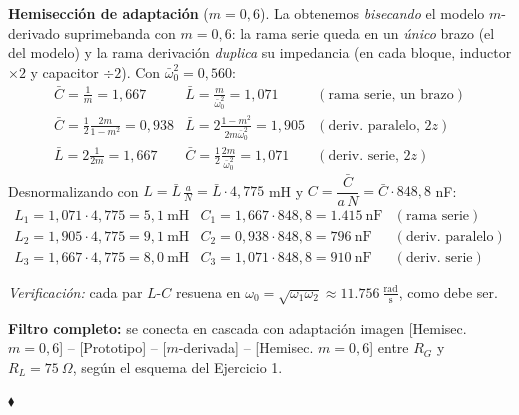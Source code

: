 \documentclass[class=article, crop=false, oneside]{standalone}
\begin{document}
\begin{figure}[H]
    \centering
    
\end{figure}

\noindent\textbf{Hemisección de adaptación} ($m = 0{,}6$). La obtenemos
\emph{bisecando} el modelo $m$-derivado suprimebanda con $m=0{,}6$: la rama serie
queda en un \emph{único} brazo (el del modelo) y la rama derivación \emph{duplica} su
impedancia (en cada bloque, inductor $\times2$ y capacitor $\div2$). Con
$\bar\omega_0^2 = 0{,}560$:
\[
    \begin{array}{lll}
        \bar C=\tfrac{1}{m}=1{,}667 & \bar L=\tfrac{m}{\bar\omega_0^2}=1{,}071 & (\text{rama serie, un brazo})\\[3pt]
        \bar C=\tfrac{1}{2}\tfrac{2m}{1-m^2}=0{,}938 & \bar L=2\tfrac{1-m^2}{2m\bar\omega_0^2}=1{,}905 & (\text{deriv.\ paralelo, }2z)\\[3pt]
        \bar L=2\tfrac{1}{2m}=1{,}667 & \bar C=\tfrac{1}{2}\tfrac{2m}{\bar\omega_0^2}=1{,}071 & (\text{deriv.\ serie, }2z)
    \end{array}
\]
Desnormalizando con $L=\bar L\,\tfrac{a}{N}=\bar L\cdot 4{,}775$ mH y $C=\dfrac{\bar C}{a\,N}=\bar C\cdot 848{,}8$ nF:
\[
    \begin{array}{lll}
        L_1 = 1{,}071\cdot 4{,}775 = 5{,}1\ \text{mH} & C_1 = 1{,}667\cdot 848{,}8 = 1.415\ \text{nF} & (\text{rama serie})\\[3pt]
        L_2 = 1{,}905\cdot 4{,}775 = 9{,}1\ \text{mH} & C_2 = 0{,}938\cdot 848{,}8 = 796\ \text{nF} & (\text{deriv.\ paralelo})\\[3pt]
        L_3 = 1{,}667\cdot 4{,}775 = 8{,}0\ \text{mH} & C_3 = 1{,}071\cdot 848{,}8 = 910\ \text{nF} & (\text{deriv.\ serie})
    \end{array}
\]

\begin{nota}
\textit{Verificación:} cada par $L$-$C$ resuena en
$\omega_0=\sqrt{\omega_1\omega_2}\approx 11.756\ \tfrac{\text{rad}}{\text{s}}$, como debe ser.
\end{nota}

\noindent\textbf{Filtro completo:} se conecta en cascada con adaptación imagen
\;\textsf{[Hemisec. $m{=}0{,}6$] -- [Prototipo] -- [$m$-derivada] -- [Hemisec. $m{=}0{,}6$]}\;
entre $R_G$ y $R_L = 75\ \Omega$, según el esquema del Ejercicio 1.

\vspace{1ex}
\begin{center}\color{utnblue}$\blacklozenge$\end{center}
\end{document}
